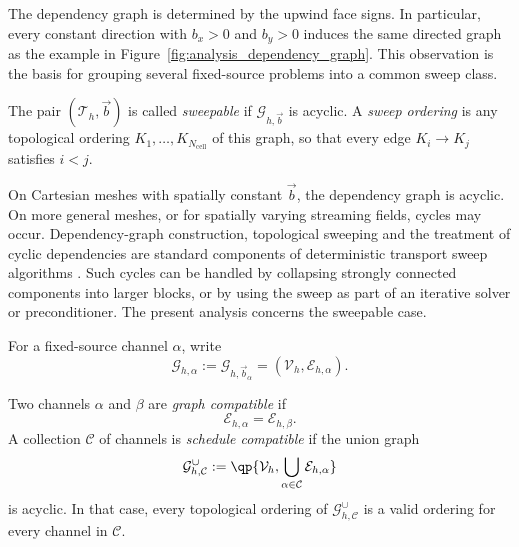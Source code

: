 \documentclass[final]{amsart}
\begin{document}
The dependency graph is determined by the upwind face signs. In
particular, every constant direction with $b_x>0$ and $b_y>0$ induces
the same directed graph as the example in
Figure~\ref{fig:analysis_dependency_graph}. This observation is the
basis for grouping several fixed-source problems into a common sweep
class.

\begin{definition}[Sweepability]
The pair $(\mathcal{T}_h,\vec b)$ is called \emph{sweepable} if
$\mathcal{G}_{h,\vec b}$ is acyclic. A \emph{sweep ordering} is any
topological ordering $K_1,\ldots,K_{N_{\mathrm{cell}}}$ of this graph,
so that every edge $K_i\to K_j$ satisfies $i<j$.
\end{definition}

On Cartesian meshes with spatially constant $\vec b$, the dependency
graph is acyclic. On more general meshes, or for spatially varying
streaming fields, cycles may occur. Dependency-graph construction,
topological sweeping and the treatment of cyclic dependencies are
standard components of deterministic transport sweep algorithms
\cite{Pautz2002,PlimptonEtAl2005,
  VermaakEtAl2021,CamminadyFrank2018Sweepable}. Such cycles can be
handled by collapsing strongly connected components into larger
blocks, or by using the sweep as part of an iterative solver or
preconditioner. The present analysis concerns the sweepable case.

For a fixed-source channel $\alpha$, write
\begin{equation}
  \mathcal{G}_{h,\alpha}
  :=
  \mathcal{G}_{h,\vec b_\alpha}
  =
  (\mathcal{V}_h,\mathcal{E}_{h,\alpha}).
\end{equation}

\begin{definition}
Two channels $\alpha$ and $\beta$ are \emph{graph compatible} if
\begin{equation}
  \mathcal{E}_{h,\alpha}
  =
  \mathcal{E}_{h,\beta}.
\end{equation}
A collection $\mathcal{C}$ of channels is \emph{schedule compatible}
if the union graph
\begin{equation}
  \mathcal{G}^{\cup}_{h,\mathcal{C}}
  :=
  \qp{
    \mathcal{V}_h,
    \bigcup_{\alpha\in\mathcal{C}}
    \mathcal{E}_{h,\alpha}
  }
\end{equation}
is acyclic. In that case, every topological ordering of
$\mathcal{G}^{\cup}_{h,\mathcal{C}}$ is a valid ordering for every
channel in $\mathcal{C}$.
\end{definition}
\end{document}
